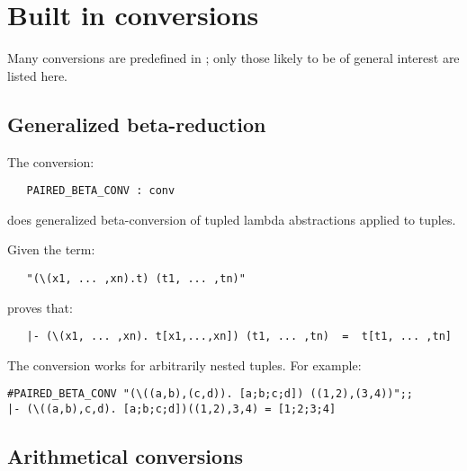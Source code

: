 \section{Built in conversions}\label{built-in-conv}


Many conversions are predefined in \HOL; only those likely to be of
general interest are listed here.

\subsection{Generalized beta-reduction}\label{genbeta}

The conversion:


\begin{boxed}
\begin{verbatim}
   PAIRED_BETA_CONV : conv
\end{verbatim}\end{boxed}

\noindent does
generalized beta-conversion of tupled lambda abstractions applied to
tuples.

Given the term:

\begin{hol}\begin{verbatim}
   "(\(x1, ... ,xn).t) (t1, ... ,tn)"
\end{verbatim}\end{hol}

\noindent {} proves that:

\begin{hol}\begin{verbatim}
   |- (\(x1, ... ,xn). t[x1,...,xn]) (t1, ... ,tn)  =  t[t1, ... ,tn]
\end{verbatim}\end{hol}

\noindent The conversion works for arbitrarily nested tuples.  For example:

\setcounter{sessioncount}{1}
\begin{session}\begin{verbatim}
#PAIRED_BETA_CONV "(\((a,b),(c,d)). [a;b;c;d]) ((1,2),(3,4))";;
|- (\((a,b),c,d). [a;b;c;d])((1,2),3,4) = [1;2;3;4]
\end{verbatim}\end{session}

\subsection{Arithmetical conversions}

